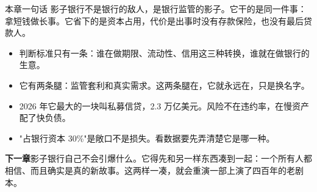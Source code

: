 \begin{takeaway}{本章一句话}
影子银行不是银行的敌人，是银行监管的影子。它干的是同一件事：拿短钱做长事。它省下的是资本占用，代价是出事时没有存款保险，也没有最后贷款人。

\begin{itemize}
  \item 判断标准只有一条：谁在做期限、流动性、信用这三种转换，谁就在做银行的生意。
  \item 它有两条腿：监管套利和真实需求。这两条腿在，它就永远在，只是换名字。
  \item 2026 年它最大的一块叫私募信贷，2.3 万亿美元。风险不在违约率，在慢资产配了快负债。
  \item "占银行资本 30\%"是敞口不是损失。看数据要先弄清楚它是哪一种。
\end{itemize}

\end{takeaway}

\begin{bridgebox}
\textbf{下一章}影子银行自己不会引爆什么。它得先和另一样东西凑到一起：一个所有人都相信、而且确实是真的新故事。这两样一凑，就会重演一部上演了四百年的老剧本。
\end{bridgebox}


